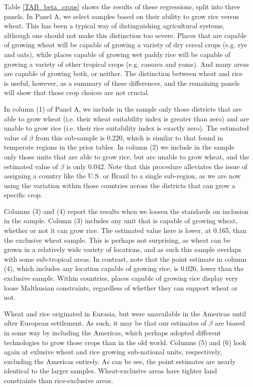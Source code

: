 \documentclass[11pt]{article}
\begin{document}
Table \ref{TAB_beta_crops} shows the results of these regressions, split into three panels. In Panel A, we select samples based on their ability to grow rice versus wheat. This has been a typical way of distinguishing agricultural systems, although one should not make this distinction too severe. Places that are capable of growing wheat will be capable of growing a variety of dry cereal crops (e.g. rye and oats), while places capable of growing wet paddy rice will be capable of growing a variety of other tropical crops (e.g. cassava and yams). And many areas are capable of growing both, or neither. The distinction between wheat and rice is useful, however, as a summary of these differences, and the remaining panels will show that those crop choices are not crucial.

In column (1) of Panel A, we include in the sample only those districts that are able to grow wheat (i.e. their wheat suitability index is greater than zero) and are unable to grow rice (i.e. their rice suitability index is exactly zero). The estimated value of $\beta$ from this sub-sample is 0.220, which is similar to that found in temperate regions in the prior tables. In column (2) we include in the sample only those units that are able to grow rice, but are unable to grow wheat, and the estimated value of $\beta$ is only 0.042. Note that this procedure alleviates the issue of assigning a country like the U.S. or Brazil to a single sub-region, as we are now using the variation within those countries across the districts that can grow a specific crop.

Columns (3) and (4) report the results when we loosen the standards on inclusion in the sample. Column (3) includes any unit that is capable of growing wheat, whether or not it can grow rice. The estimated value here is lower, at 0.165, than the exclusive wheat sample. This is perhaps not surprising, as wheat can be grown in a relatively wide variety of locations, and as such this sample overlaps with some sub-tropical areas. In contrast, note that the point estimate in column (4), which includes any location capable of growing rice, is 0.026, lower than the exclusive sample. Within countries, places capable of growing rice display very loose Malthusian constraints, regardless of whether they can support wheat or not. 

Wheat and rice originated in Eurasia, but were unavailable in the Americas until after European settlement. As such, it may be that our estimates of $\beta$ are biased in some way by including the Americas, which perhaps adopted different technologies to grow those crops than in the old world. Columns (5) and (6) look again at exlusive wheat and rice growing sub-national units, respectively, excluding the Americas entirely. As can be see, the point estimates are nearly identical to the larger samples. Wheat-exclusive areas have tighter land constraints than rice-exclusive areas.
\end{document}
